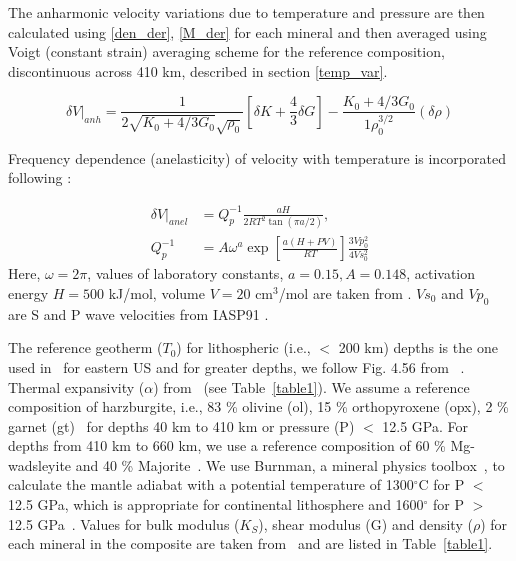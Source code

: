 \documentclass[draft,linenumbers]{agujournal2018}
\begin{document}
The anharmonic velocity variations due to temperature and pressure are then calculated using \ref{den_der}, \ref{M_der} for each mineral and then averaged using Voigt (constant strain) averaging scheme for the reference composition, discontinuous across 410 km,  described in section \ref{temp_var}.

\begin{equation} \label{anh}
    \delta V \vert_{anh} = \frac{1}{2\sqrt{K_0 + 4/3 G_0} \sqrt{\rho_0}} \left[\delta K + \frac{4}{3} \delta G \right] - \frac{K_0 + 4/3 G_0}{1\rho_0^{3/2}} ( \delta \rho)
\end{equation} 

Frequency dependence (anelasticity) of velocity with temperature is incorporated following \citet{Goes_2000}:

\begin{align} \label{anel}
    \delta V \vert_{anel} &= Q_p^{-1} \frac{aH}{2 R T^2 \tan(\pi a/2)},\\
    Q_p^{-1} &= A \omega^{a} \exp \left[ \frac{a(H+PV)}{RT} \right] \frac{3Vp_{0}^{2}}{4Vs_{0}^{2}} \nonumber
\end{align}
Here, $\omega = 2\pi $, values of laboratory constants, $a = 0.15, A = 0.148$, activation energy $H = 500$ kJ/mol, volume $V = 20$ cm$^3$/mol are taken from \citet{sobolev1996upper}. $Vs_0$ and $Vp_0$ are S and P wave velocities from IASP91 \citep{kennett1991traveltimes}.

The reference geotherm ($T_0$) for lithospheric (i.e., $<$ 200 km) depths is the one used in~\citep{Goes_2002} for eastern US and for greater depths, we follow Fig. 4.56 from~\citet{turcotte2014geodynamics} . Thermal expansivity ($\alpha$) from~\citet{saxena_data} (see Table~\ref{table1}). We assume a reference composition of harzburgite, i.e., 83 \% olivine (ol), 15 \% orthopyroxene (opx), 2 \% garnet (gt)~\citep{mcdonough1998mineralogy} for depths 40 km to 410 km or pressure (P) $<$ 12.5 GPa. For depths from 410 km to 660 km, we use a reference composition of 60 \% Mg-wadsleyite and 40 \% Majorite~\citep{haggerty1995upper}. We use Burnman, a mineral physics toolbox~\citep{cottaar2014burnman}, to calculate the mantle adiabat with a potential temperature of 1300$^{\circ}$C for P $<$ 12.5 GPa, which is appropriate for continental lithosphere \citep{rudnick1998thermal} and 1600$^{\circ}$ for P $>$ 12.5 GPa~\citep{katsura2010adiabatic}. Values for bulk modulus ($K_S$), shear modulus (G) and density ($\rho$) for each mineral in the composite are taken from~\citet{Cammarano2003} and are listed in Table~\ref{table1}.
\end{document}
